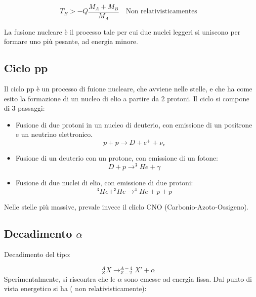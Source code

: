 \documentclass{article}
\begin{document}
\begin{equation}
    T_B>-Q\frac{M_A+M_B}{M_A} \quad \text{Non relativisticamentes}
\end{equation}

La fusione nucleare è il processo tale per cui due nuclei leggeri si uniscono per formare uno più pesante, ad energia minore.

\subsection{Ciclo pp}
Il ciclo pp è un processo di fuione nucleare, che avviene nelle stelle, e che ha come esito la formazione di un nucleo di elio a partire da 2 protoni.
Il ciclo si compone di 3 passaggi:

\begin{itemize}
    \item Fusione di due protoni in un nucleo di deuterio, con emissione di un positrone e un neutrino elettronico.
          \begin{equation}
              p+p\rightarrow D+e^++\nu_e
          \end{equation}
    \item Fusione di un deuterio con un protone, con emissione di un fotone:
          \begin{equation}
              D+p\rightarrow ^3He+\gamma
          \end{equation}
    \item Fusione di due nuclei di elio, con emissione di due protoni:
          \begin{equation}
              ^3He+^3He\rightarrow ^4He+p+p
          \end{equation}
\end{itemize}


Nelle stelle più massive, prevale invece il cliclo CNO (Carbonio-Azoto-Ossigeno).

\subsection{Decadimento $\alpha$}

Decadimento del tipo:

\begin{equation}
    ^A_ZX\rightarrow ^{A-4}_{Z-2}X'+\alpha
\end{equation}
Sperimentalmente, si riscontra che le $\alpha$ sono emesse ad energia fissa.
Dal punto di vista energetico si ha ( non relativisticamente):
\end{document}
